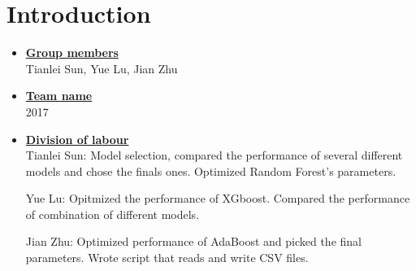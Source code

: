 \newif\ifshowsolutions
\showsolutionstrue

\newcommand{\boldline}[1]{\underline{\textbf{#1}}}



\pagestyle{fancy}






\section{Introduction}
\medskip
\begin{itemize}

    \item \boldline{Group members} \\
    Tianlei Sun, Yue Lu, Jian Zhu
    
    \item \boldline{Team name} \\
    2017
    
    \item \boldline{Division of labour} \\
    Tianlei Sun: Model selection, compared the performance of several different models and chose the finals ones. Optimized Random Forest's parameters.
    
    Yue Lu: Opitmized the performance of XGboost. Compared the performance of combination of different models. 
    
    Jian Zhu: Optimized performance of AdaBoost and picked the final parameters. Wrote script that reads and write CSV files.
    
\end{itemize}



